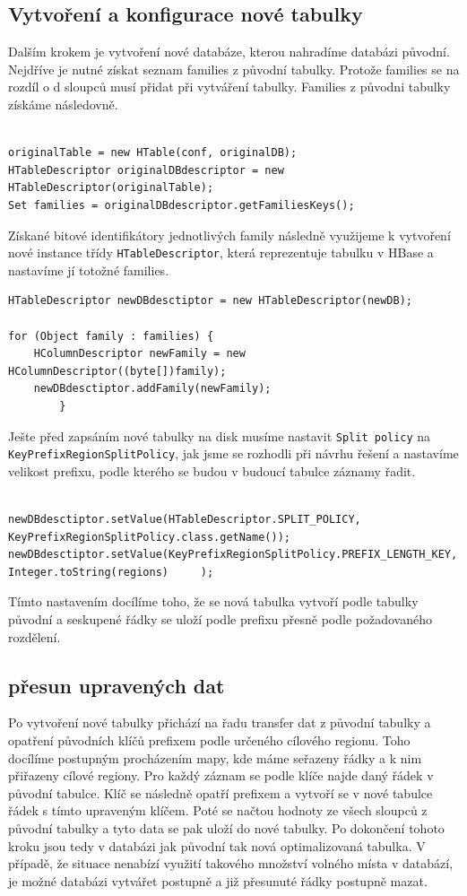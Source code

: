 \documentclass[thesis=M,czech]{FITthesis}[2012/06/26]
\begin{document}
\subsection{Vytvoření a konfigurace nové tabulky}
Dalším krokem je vytvoření nové databáze, kterou nahradíme databázi původní. Nejdříve je nutné získat seznam families z původní tabulky. Protože families se na rozdíl o d sloupců musí přidat při vytváření tabulky. Families z původni tabulky získáme následovně. \pagebreak


\begin{lstlisting}[frame=single]  % Start your code-block

originalTable = new HTable(conf, originalDB);
HTableDescriptor originalDBdescriptor = new HTableDescriptor(originalTable);
Set families = originalDBdescriptor.getFamiliesKeys();
\end{lstlisting}
Získané bitové identifikátory jednotlivých family následně využijeme k vytvoření nové instance třídy \texttt{HTableDescriptor}, která reprezentuje tabulku v HBase a nastavíme jí totožné families.
\begin{lstlisting}[frame=single]  % Start your code-block
HTableDescriptor newDBdesctiptor = new HTableDescriptor(newDB);

for (Object family : families) {
    HColumnDescriptor newFamily = new HColumnDescriptor((byte[])family);
    newDBdesctiptor.addFamily(newFamily);
        }
\end{lstlisting}
Ješte před zapsáním nové tabulky na disk musíme nastavit \texttt{Split policy}  na \texttt{KeyPrefixRegionSplitPolicy}, jak jsme se rozhodli při návrhu řešení a nastavíme velikost prefixu, podle kterého se budou v budoucí tabulce záznamy řadit.
\begin{lstlisting}[frame=single]  % Start your code-block

newDBdesctiptor.setValue(HTableDescriptor.SPLIT_POLICY, KeyPrefixRegionSplitPolicy.class.getName());
newDBdesctiptor.setValue(KeyPrefixRegionSplitPolicy.PREFIX_LENGTH_KEY, 
Integer.toString(regions)     );
\end{lstlisting}

Tímto nastavením docílíme toho, že se nová tabulka vytvoří podle tabulky původní a seskupené řádky se uloží podle prefixu přesně podle požadovaného rozdělení.
\subsection{přesun upravených dat}
Po vytvoření nové tabulky přichází na řadu transfer dat z původní tabulky a opatření původních klíčů prefixem podle určeného cílového regionu. Toho docílíme postupným procházením mapy, kde máme seřazeny řádky a k nim přiřazeny cílové regiony. Pro každý záznam se podle klíče najde daný řádek v původní tabulce. Klíč se následně opatří prefixem a vytvoří se v nové tabulce řádek s tímto upraveným klíčem. Poté se načtou hodnoty ze všech sloupců z původní tabulky a tyto data se pak uloží do nové tabulky. Po dokončení tohoto kroku jsou tedy v databázi jak původní tak nová optimalizovaná tabulka. V případě, že situace nenabízí využití takového množství volného místa v databází, je možné databázi vytvářet postupně a již přesunuté řádky postupně mazat. 
\end{document}
